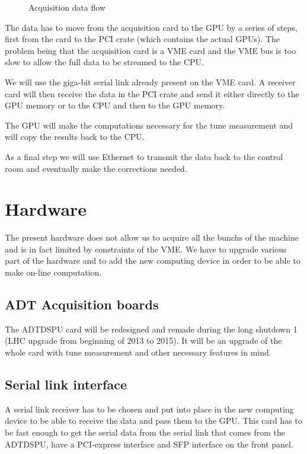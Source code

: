 \begin{figure}[H]
\caption{Acquisition data flow}
\label{fig:data_flow}
\centering
\end{figure}

The data has to move from the acquisition card to the GPU by a series of steps, first from the card to the PCI crate (which contains the actual \glspl{GPU}). The problem being that the acquisition card is a \gls{VME} card and the VME bus is too slow to allow the full data to be streamed to the \gls{CPU}. 

We will use the giga-bit serial link already present on the VME
card. A receiver card will then receive the data in the PCI crate and
send it either directly to the \gls{GPU} memory or to the \gls{CPU}
and then to the \gls{GPU} memory.

The \gls{GPU} will make the computations necessary for the \gls{tune} measurement and will copy the results back to the \gls{CPU}.

As a final step we will use Ethernet to transmit the data back to the control room and eventually make the corrections needed.

\section{Hardware}

The present hardware does not allow us to acquire all the \glspl{bunch} of the machine and is in fact limited by constraints of the \gls{VME}. We have to upgrade various part of the hardware and to add the new computing device in order to be able to make on-line computation.

\subsection{ADT Acquisition boards}

The \gls{ADTDSPU} card will be redesigned and remade during the long shutdown 1 (\gls{LHC} upgrade from beginning of 2013 to 2015). It will be an upgrade of the whole card with \gls{tune} measurement and other necessary features in mind.

\subsection{Serial link interface}

A serial link receiver has to be chosen and put into place in the new computing device to be able to receive the data and pass them to the \gls{GPU}. This card has to be fast enough to get the serial data from the serial link that comes from the ADTDSPU, have a PCI-express interface and \gls{SFP} interface on the front panel. 

